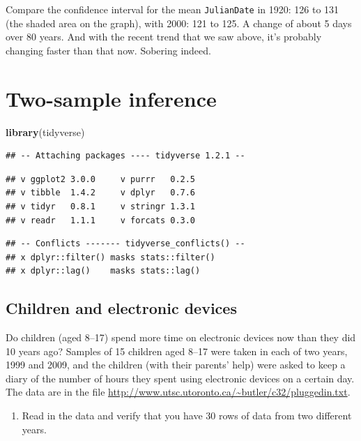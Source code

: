 \documentclass[]{tufte-book}
\newenvironment{Shaded}{}{}
\newcommand{\KeywordTok}[1]{\textcolor[rgb]{0.00,0.44,0.13}{\textbf{#1}}}
\newcommand{\NormalTok}[1]{#1}
\providecommand{\tightlist}{%
  \setlength{\itemsep}{0pt}\setlength{\parskip}{0pt}}
\theoremstyle{definition}
\theoremstyle{definition}
\theoremstyle{definition}
\theoremstyle{remark}
\begin{document}
Compare the confidence interval for the mean \texttt{JulianDate} in
1920: 126 to 131 (the shaded area on the graph), with 2000: 121 to 125.
A change of about 5 days over 80 years. And with the recent trend that
we saw above, it's probably changing faster than that now. Sobering
indeed.

\hypertarget{two-sample-inference}{%
\chapter{Two-sample inference}\label{two-sample-inference}}

\begin{Shaded}
\begin{Highlighting}[]
\KeywordTok{library}\NormalTok{(tidyverse)}
\end{Highlighting}
\end{Shaded}

\begin{verbatim}
## -- Attaching packages ---- tidyverse 1.2.1 --
\end{verbatim}

\begin{verbatim}
## v ggplot2 3.0.0     v purrr   0.2.5
## v tibble  1.4.2     v dplyr   0.7.6
## v tidyr   0.8.1     v stringr 1.3.1
## v readr   1.1.1     v forcats 0.3.0
\end{verbatim}

\begin{verbatim}
## -- Conflicts ------- tidyverse_conflicts() --
## x dplyr::filter() masks stats::filter()
## x dplyr::lag()    masks stats::lag()
\end{verbatim}

\hypertarget{children-and-electronic-devices}{%
\section{Children and electronic
devices}\label{children-and-electronic-devices}}

Do children (aged 8--17) spend more time on electronic devices now than
they did 10 years ago? Samples of 15 children aged 8--17 were taken in
each of two years, 1999 and 2009, and the children (with their parents'
help) were asked to keep a diary of the number of hours they spent using
electronic devices on a certain day. The data are in the file
\url{http://www.utsc.utoronto.ca/~butler/c32/pluggedin.txt}.

\begin{enumerate}
\def\labelenumi{(\alph{enumi})}
\tightlist
\item
  Read in the data and verify that you have 30 rows of data from two
  different years.
\end{enumerate}
\end{document}
